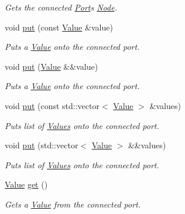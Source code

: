 \begin{DoxyCompactItemize}
\begin{DoxyCompactList}\small\item\em Gets the connected \hyperlink{classdg_1_1deepcore_1_1_port}{Port}\textquotesingle{}s \hyperlink{classdg_1_1deepcore_1_1_node}{Node}. \end{DoxyCompactList}\item 
void \hyperlink{classdg_1_1deepcore_1_1_port_af97b459eaaf922ac144b7d86c0c1193c}{put} (const \hyperlink{classdg_1_1deepcore_1_1_value}{Value} \&value)
\begin{DoxyCompactList}\small\item\em Puts a \hyperlink{classdg_1_1deepcore_1_1_value}{Value} onto the connected port. \end{DoxyCompactList}\item 
void \hyperlink{classdg_1_1deepcore_1_1_port_a019d9b2f617645619de315c31c93be41}{put} (\hyperlink{classdg_1_1deepcore_1_1_value}{Value} \&\&value)
\begin{DoxyCompactList}\small\item\em Puts a \hyperlink{classdg_1_1deepcore_1_1_value}{Value} onto the connected port. \end{DoxyCompactList}\item 
void \hyperlink{classdg_1_1deepcore_1_1_port_adb77d90d29711226a85f171b0c02d91d}{put} (const std\+::vector$<$ \hyperlink{classdg_1_1deepcore_1_1_value}{Value} $>$ \&values)
\begin{DoxyCompactList}\small\item\em Puts list of \hyperlink{classdg_1_1deepcore_1_1_value}{Values} onto the connected port. \end{DoxyCompactList}\item 
void \hyperlink{classdg_1_1deepcore_1_1_port_a7d6a6b271557a6a1e291d068a26bc2f2}{put} (std\+::vector$<$ \hyperlink{classdg_1_1deepcore_1_1_value}{Value} $>$ \&\&values)
\begin{DoxyCompactList}\small\item\em Puts list of \hyperlink{classdg_1_1deepcore_1_1_value}{Values} onto the connected port. \end{DoxyCompactList}\item 
\hyperlink{classdg_1_1deepcore_1_1_value}{Value} \hyperlink{classdg_1_1deepcore_1_1_port_ac197293fca517fcdbbc5b591d5c9d9c5}{get} ()
\begin{DoxyCompactList}\small\item\em Gets a \hyperlink{classdg_1_1deepcore_1_1_value}{Value} from the connected port. \end{DoxyCompactList}\item 

\end{DoxyCompactItemize}

